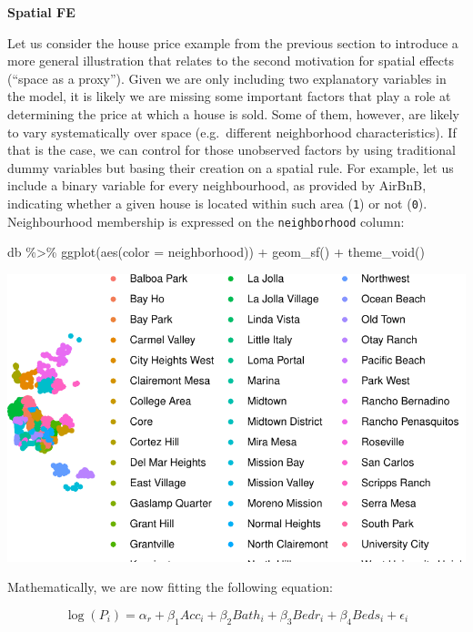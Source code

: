 \documentclass[
  letterpaper,
  DIV=11,
  numbers=noendperiod,
  oneside]{scrreprt}
\newenvironment{Shaded}{\begin{snugshade}}{\end{snugshade}}
\newcommand{\AttributeTok}[1]{\textcolor[rgb]{0.40,0.45,0.13}{#1}}
\newcommand{\FunctionTok}[1]{\textcolor[rgb]{0.28,0.35,0.67}{#1}}
\newcommand{\NormalTok}[1]{\textcolor[rgb]{0.00,0.23,0.31}{#1}}
\newcommand{\SpecialCharTok}[1]{\textcolor[rgb]{0.37,0.37,0.37}{#1}}
\begin{document}
\textbf{Spatial FE}

Let us consider the house price example from the previous section to
introduce a more general illustration that relates to the second
motivation for spatial effects (``space as a proxy''). Given we are only
including two explanatory variables in the model, it is likely we are
missing some important factors that play a role at determining the price
at which a house is sold. Some of them, however, are likely to vary
systematically over space (e.g.~different neighborhood characteristics).
If that is the case, we can control for those unobserved factors by
using traditional dummy variables but basing their creation on a spatial
rule. For example, let us include a binary variable for every
neighbourhood, as provided by AirBnB, indicating whether a given house
is located within such area (\texttt{1}) or not (\texttt{0}).
Neighbourhood membership is expressed on the \texttt{neighborhood}
column:

\begin{Shaded}
\begin{Highlighting}[]
\NormalTok{db }\SpecialCharTok{\%\textgreater{}\%}
  \FunctionTok{ggplot}\NormalTok{(}\FunctionTok{aes}\NormalTok{(}\AttributeTok{color =}\NormalTok{ neighborhood)) }\SpecialCharTok{+}
  \FunctionTok{geom\_sf}\NormalTok{() }\SpecialCharTok{+} 
  \FunctionTok{theme\_void}\NormalTok{()}
\end{Highlighting}
\end{Shaded}

\includegraphics{06-spatial-econometrics_files/figure-pdf/unnamed-chunk-7-1.pdf}

Mathematically, we are now fitting the following equation:

\[
\log(P_i) = \alpha_r + \beta_1 Acc_i + \beta_2 Bath_i + \beta_3 Bedr_i + \beta_4 Beds_i + \epsilon_i
\]
\end{document}
